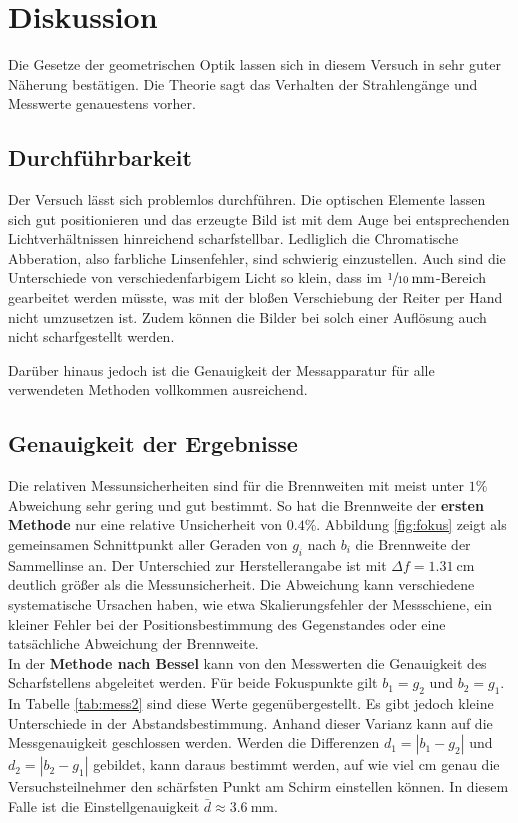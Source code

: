 \section{Diskussion}
\label{sec:Diskussion}
Die Gesetze der geometrischen Optik lassen sich in diesem Versuch in sehr guter Näherung bestätigen. Die Theorie sagt das Verhalten der Strahlengänge und Messwerte genauestens vorher.

\subsection{Durchführbarkeit}
Der Versuch lässt sich problemlos durchführen. Die optischen Elemente lassen sich gut positionieren und das erzeugte Bild ist mit dem Auge bei entsprechenden Lichtverhältnissen
hinreichend scharfstellbar. Ledliglich die Chromatische Abberation, also farbliche Linsenfehler, sind schwierig einzustellen. Auch sind die Unterschiede von verschiedenfarbigem Licht
so klein, dass im $\sfrac{1}{10}\:\si{\milli\meter}$-Bereich gearbeitet werden müsste, was mit der bloßen Verschiebung der Reiter per Hand nicht umzusetzen ist.
Zudem können die Bilder bei solch einer Auflösung auch nicht scharfgestellt werden.

Darüber hinaus jedoch ist die Genauigkeit der Messapparatur für alle verwendeten Methoden vollkommen ausreichend.

\subsection{Genauigkeit der Ergebnisse}
Die relativen Messunsicherheiten sind für die Brennweiten mit meist unter $1\%$ Abweichung sehr gering und gut bestimmt. So hat die Brennweite der \textbf{ersten Methode} nur eine relative
Unsicherheit von $0.4\%$. Abbildung \ref{fig:fokus} zeigt als gemeinsamen Schnittpunkt aller Geraden von $g_i$ nach $b_i$ die Brennweite der Sammellinse an. Der Unterschied 
zur Herstellerangabe ist mit $\Delta f = \SI{1.31}{\centi\meter}$ deutlich größer als die Messunsicherheit. Die Abweichung kann verschiedene systematische Ursachen haben, wie etwa
Skalierungsfehler der Messschiene, ein kleiner Fehler bei der Positionsbestimmung des Gegenstandes oder eine tatsächliche Abweichung der Brennweite. \\

In der \textbf{Methode nach Bessel} kann von den Messwerten die Genauigkeit des Scharfstellens abgeleitet werden. Für beide Fokuspunkte gilt $b_1=g_2$ und $b_2=g_1$.
In Tabelle \ref{tab:mess2} sind diese Werte gegenübergestellt. Es gibt jedoch kleine Unterschiede in der Abstandsbestimmung. Anhand dieser Varianz kann auf die Messgenauigkeit geschlossen
werden. Werden die Differenzen $d_1 = |b_1 - g_2|$ und $d_2 = |b_2 - g_1|$ gebildet, kann daraus bestimmt werden, auf wie viel $\si{\centi\meter}$ genau die Versuchsteilnehmer den schärfsten
Punkt am Schirm einstellen können. In diesem Falle ist die Einstellgenauigkeit $\bar{d} \approx \SI{3.6}{\milli\meter}$.

